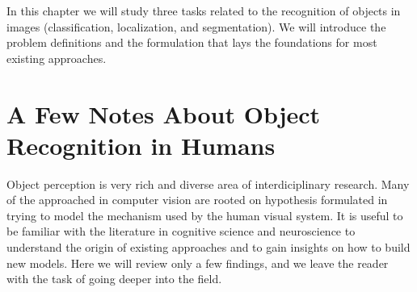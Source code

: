 In this chapter we will study three tasks related to the recognition of objects in images (classification, localization, and segmentation). We will introduce the problem definitions and the formulation that lays the foundations for most existing approaches. 







\section{A Few Notes About Object Recognition in Humans}

Object perception is very rich and diverse area of interdiciplinary research. Many of the approached in computer vision are rooted on hypothesis formulated in trying to model the mechanism used by the human visual system. It is useful to be familiar with the literature in cognitive science and neuroscience to understand the origin of existing approaches and to gain insights on how to build new models. Here we will review only a few findings, and we leave the reader with the task of going deeper into the field. 


